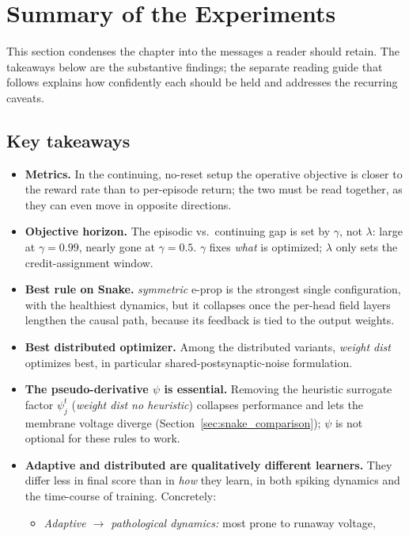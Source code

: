 \section{Summary of the Experiments}
\label{sec:experiments-summary}

This section condenses the chapter into the messages a reader should retain.
The takeaways below are the substantive findings; the separate reading guide that follows explains
how confidently each should be held and addresses the recurring caveats.

\subsection*{Key takeaways}

\begin{itemize}
  \item \textbf{Metrics.} In the continuing, no-reset setup the operative objective is closer to the
  reward rate than to per-episode return; the two must be read together, as they can even move in
  opposite directions.
  \item \textbf{Objective horizon.} The episodic vs.\ continuing gap is set by $\gamma$, not
  $\lambda$: large at $\gamma=0.99$, nearly gone at $\gamma=0.5$. $\gamma$ fixes \emph{what} is
  optimized; $\lambda$ only sets the credit-assignment window.
  \item \textbf{Best rule on Snake.} \emph{symmetric} e-prop is the strongest single configuration,
  with the healthiest dynamics, but it collapses once the per-head field layers lengthen the causal
  path, because its feedback is tied to the output weights.
  \item \textbf{Best distributed optimizer.} Among the distributed variants, \emph{weight dist}
  optimizes best, in particular shared-postsynaptic-noise formulation.
  \item \textbf{The pseudo-derivative $\psi$ is essential.} Removing the heuristic surrogate factor
  $\psi^t_j$ (\emph{weight dist no heuristic}) collapses performance and lets the membrane voltage
  diverge (Section~\ref{sec:snake_comparison}); $\psi$ is not optional for these rules to work.
  \item \textbf{Adaptive and distributed are qualitatively different learners.} They differ less in
  final score than in \emph{how} they learn, in both spiking dynamics and the time-course of
  training. Concretely:
  \begin{itemize}
    \item \emph{Adaptive $\rightarrow$ pathological dynamics:} most prone to runaway voltage,

\end{itemize}
\end{itemize}
